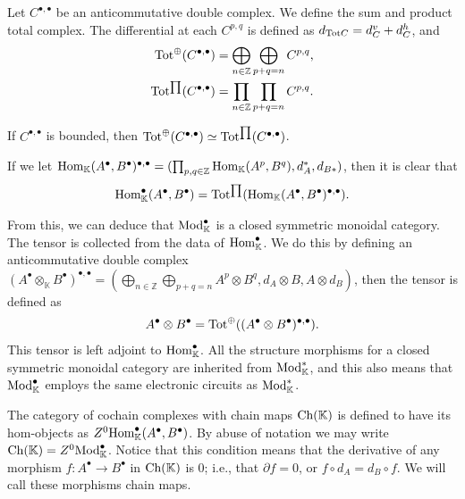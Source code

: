 \documentclass[../thesis.tex]{subfiles}
\begin{document}
            \begin{definition}
                Let $C^{\bullet, \bullet}$ be an anticommutative double complex. We define the sum and product total complex. The differential at each $C^{p,q}$ is defined as $d_{\tt{Tot}C} = d^v_C + d^h_C$, and
                \begin{align*}
                    \tt{Tot}^{\oplus}(C^{\bullet, \bullet}) & = \bigoplus_{n\in\mathbb{Z}}\bigoplus_{p+q=n}C^{p,q}\tt{,} \\
                    \tt{Tot}^{\prod}(C^{\bullet, \bullet}) & = \prod_{n\in \mathbb{Z}}\prod_{p+q=n}C^{p,q}\tt{.}
                \end{align*}
            \end{definition}
            
            If $C^{\bullet, \bullet}$ is bounded, then $\tt{Tot}^\oplus(C^{\bullet, \bullet}) \simeq \tt{Tot}^{\prod}(C^{\bullet, \bullet})$.

            If we let $\tt{Hom}_\mathbb{K}(A^\bullet, B^\bullet)^{\bullet, \bullet} = (\prod_{p,q\in\mathbb{Z}}\tt{Hom}_\mathbb{K}(A^p,B^q), d_A^*, d_{B*})$, then it is clear that
            \begin{align*}
                \tt{Hom}_\mathbb{K}^\bullet(A^\bullet,B^\bullet) = \tt{Tot}^{\prod}(\tt{Hom}_\mathbb{K}(A^\bullet, B^\bullet)^{\bullet, \bullet})\tt{.}
            \end{align*}

            From this, we can deduce that $\tt{Mod}_\mathbb{K}^\bullet$ is a closed symmetric monoidal category. The tensor is collected from the data of $\tt{Hom}_\mathbb{K}^\bullet$. We do this by defining an anticommutative double complex $(A^\bullet \otimes_\mathbb{K} B^\bullet)^{\bullet, \bullet} = (\bigoplus_{n\in\mathbb{Z}}\bigoplus_{p+q=n}A^p\otimes B^q, d_A\otimes B,A\otimes d_B)$, then the tensor is defined as
            \begin{align*}
                A^\bullet \otimes B^\bullet = \tt{Tot}^\oplus((A^\bullet \otimes B^\bullet)^{\bullet, \bullet})\tt{.}
            \end{align*}
            This tensor is left adjoint to $\tt{Hom}_\mathbb{K}^\bullet$. All the structure morphisms for a closed symmetric monoidal category are inherited from $\tt{Mod}_\mathbb{K}^*$, and this also means that $\tt{Mod}_\mathbb{K}^\bullet$ employs the same electronic circuits as $\tt{Mod}_\mathbb{K}^*$.

            The category of cochain complexes with chain maps $\tt{Ch}(\mathbb{K})$ is defined to have its hom-objects as $Z^0\tt{Hom}_\mathbb{K}^\bullet(A^\bullet, B^\bullet)$. By abuse of notation we may write $\tt{Ch}(\mathbb{K}) = Z^0\tt{Mod}_\mathbb{K}^\bullet$. Notice that this condition means that the derivative of any morphism $f: A^\bullet \rightarrow B^\bullet$ in $\tt{Ch}(\mathbb{K})$ is $0$; i.e., that $\partial f = 0$, or $f\circ d_A = d_B \circ f$. We will call these morphisms chain maps.
\end{document}
